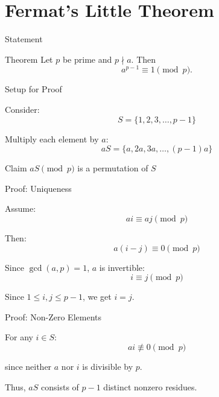 \documentclass{beamer}
\begin{document}
\section{Fermat's Little Theorem}

\begin{frame}{Statement}

\begin{block}{Theorem}
Let $p$ be prime and $p \nmid a$. Then
\[
a^{p-1} \equiv 1 \pmod{p}.
\]
\end{block}

\end{frame}


\begin{frame}{Setup for Proof}

Consider:
\[
S = \{1,2,3,\dots,p-1\}
\]

Multiply each element by $a$:
\[
aS = \{a,2a,3a,\dots,(p-1)a\}
\]

\vspace{1em}

\begin{block}{Claim}
$aS\pmod{p}$ is a permutation of $S$
\end{block}

\end{frame}


\begin{frame}{Proof: Uniqueness}

Assume:
\[
ai \equiv aj \pmod{p}
\]

Then:
\[
a(i-j) \equiv 0 \pmod{p}
\]

Since $\gcd(a,p)=1$, $a$ is invertible:
\[
i \equiv j \pmod{p}
\]

Since $1 \le i,j \le p-1$, we get $i=j$.

\end{frame}


\begin{frame}{Proof: Non-Zero Elements}

For any $i \in S$:
\[
ai \not\equiv 0 \pmod{p}
\]

since neither $a$ nor $i$ is divisible by $p$.

\vspace{1em}

Thus, $aS$ consists of $p-1$ distinct nonzero residues.

\end{frame}
\end{document}
